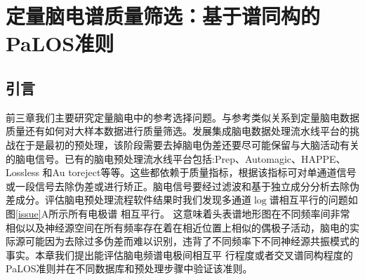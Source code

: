 \chapter{定量脑电谱质量筛选：基于谱同构的PaLOS准则}
\section{引言}
前三章我们主要研究定量脑电中的参考选择问题。与参考类似关系到定量脑电数据质量还有如何对大样本数据进行质量筛选。发展集成脑电数据处理流水线平台的挑战在于是最初的预处理，该阶段需要去掉脑电伪差还要尽可能保留与大脑活动有关的脑电信号。已有的脑电预处理流水线平台包括:Prep、Automagic、HAPPE、Lossless 和Au
toreject等等。这些都依赖于质量指标，根据该指标可对单通道信号或一段信号去除伪差或进行矫正。脑电信号要经过滤波和基于独立成分分析去除伪差成分。评估脑电预处理流程软件结果时我们发现多通道$\log$谱相互平行的问题如图\ref{issue}A所示所有电极谱
相互平行。 这意味着头表谱地形图在不同频率间非常相似以及神经源空间在所有频率存在着在相近位置上相似的偶极子活动，脑电的实际源可能因为去除过多伪差而难以识别，违背了不同频率下不同神经源共振模式的事实。本章我们提出能评估脑电频谱电极间相互平
行程度或者交叉谱同构程度的PaLOS准则并在不同数据库和预处理步骤中验证该准则。

